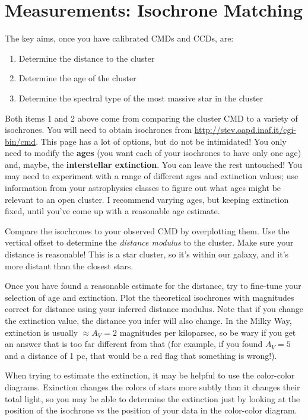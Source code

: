 \documentclass[11pt]{article}
\begin{document}
\section{Measurements: Isochrone Matching}

The key aims, once you have calibrated CMDs and CCDs, are:
\begin{enumerate}
    \item Determine the distance to the cluster
    \item Determine the age of the cluster
    \item Determine the spectral type of the most massive star in the cluster
\end{enumerate}

Both items 1 and 2 above come from comparing the cluster CMD to a variety of isochrones.
You will need to obtain isochrones from \url{http://stev.oapd.inaf.it/cgi-bin/cmd}.
This page has a lot of options, but do not be intimidated!  You only need to modify the
\textbf{ages} (you want each of your isochrones to have only one age) and, maybe,
the \textbf{interstellar extinction}.  You can leave the rest untouched!
You may need to experiment with a range of different ages and extinction values;
use information from your astrophysics classes to figure out what ages might
be relevant to an open cluster.  I recommend varying ages, but keeping extinction
fixed, until you've come up with a reasonable age estimate.

Compare the isochrones to your observed CMD by overplotting them.
Use the vertical offset to determine the \emph{distance modulus} to the cluster.
Make sure your distance is reasonable!  This is a star cluster, so it's within our galaxy,
and it's more distant than the closest stars.

Once you have found a reasonable estimate for the distance, try to fine-tune your selection
of age and extinction.  Plot the theoretical isochrones with magnitudes correct for distance
using your inferred distance modulus.  Note that if you change the extinction value, the distance you infer will
also change.  In the Milky Way, extinction is usually $\approx A_V=2$ magnitudes per kiloparsec,
so be wary if you get an answer that is too far different from that (for example, if you found
$A_V=5$ and a distance of 1 pc, that would be a red flag that something is wrong!).

When trying to estimate the extinction, it may be helpful to use the color-color diagrams.
Exinction changes the colors of stars more subtly than it changes their total light, so you
may be able to determine the extinction just by looking at the position of the isochrone
vs the position of your data in the color-color diagram.
\end{document}
